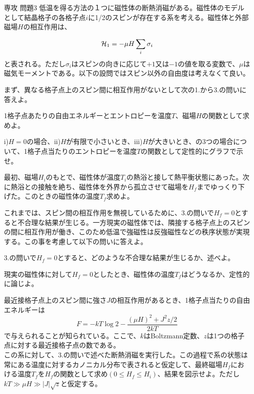 \documentclass[fleqn]{jbook}
\begin{document}
\begin{question}{専攻 問題3}{}
低温を得る方法の１つに磁性体の断熱消磁がある。磁性体のモデルとして結晶格子の各格子点$i$に1/2のスピンが存在する系を考える。磁性体と外部磁場$H$の相互作用は、

\[ {\cal H}_1=-\mu H \sum _i \sigma _i \]
と表される。ただし$\sigma_i$はスピンの向きに応じて$+1$又は$-1$の値を取る変数で、$\mu$は磁気モーメントである。以下の設問ではスピン以外の自由度は考えなくて良い。

まず、異なる格子点上のスピン間に相互作用がないとして次の1.から3.の問いに答えよ。


\begin{subquestions}
\SubQuestion
1格子点あたりの自由エネルギーとエントロピーを温度$T$、磁場$H$の関数として求めよ。

\SubQuestion
i)$H=0$の場合、ii)$H$が有限で小さいとき、iii)$H$が大きいとき、の3つの場合について、1格子点当たりのエントロピーを温度$T$の関数として定性的にグラフで示せ。

\SubQuestion
最初、磁場$H_i$のもとで、磁性体が温度$T_i$の熱浴と接して熱平衡状態にあった。次に熱浴との接触を絶ち、磁性体を外界から孤立させて磁場を$H_f$までゆっくり下げた。このときの磁性体の温度$T_f$求めよ。

\end{subquestions}

  これまでは、スピン間の相互作用を無視しているために、3.の問いで$H_f=0$とすると不合理な結果が生じる。一方現実の磁性体では、隣接する格子点上のスピンの間に相互作用が働き、このため低温で強磁性は反強磁性などの秩序状態が実現する。この事を考慮して以下の問いに答えよ。

\begin{subquestions}[4]
\SubQuestion
3.の問いで$H_f=0$とすると、どのような不合理な結果が生じるか、述べよ。

\SubQuestion
現実の磁性体に対して$H_f=0$としたとき、磁性体の温度$T_f$はどうなるか、定性的に論じよ。

\SubQuestion
最近接格子点上のスピン間に強さ$J$の相互作用があるとき、1格子点当たりの自由エネルギーは
	\[
	F=-kT \log 2 -\frac{(\mu H)^2 + J^2z/2}{2kT}
	\]
	で与えられることが知られている。ここで、$k$はBoltzmann定数、$z$は1つの格子点に対する最近接格子点の数である。\\
	
	
	この系に対して、3.の問いで述べた断熱消磁を実行した。この過程で系の状態は常にある温度に対するカノニカル分布で表されると仮定して、最終磁場$H_f$における温度$T_f$を$H_f$の関数として求め$(0 \le H_f \le H_i)$、結果を図示せよ。ただし$kT \gg \mu H \gg |J|\sqrt{z}$と仮定する。
\end{subquestions}
\end{question}
\end{document}
